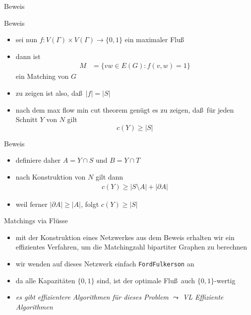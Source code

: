 \documentclass[aspectratio=1610, 11pt]{beamer}
\begin{document}
\begin{frame}
\begin{overprint}
\begin{exampleblock}{Beweis}
\begin{itemize}
			\end{itemize}
		\end{exampleblock}
		\begin{exampleblock}{Beweis}
			\begin{itemize}
				\item sei nun $f:V(\Gamma)\times V(\Gamma)\to\{0,1\}$ ein maximaler Flu\ss
				\item dann ist
					\begin{align*}
						M&=\{vw\in E(G):f(v,w)=1\}
					\end{align*}
					ein Matching von $G$
				\item zu zeigen ist also, da\ss\ $|f|=|S|$
				\item nach dem max flow min cut theorem gen\"ugt es zu zeigen, da\ss\ f\"ur jeden Schnitt $Y$ von $N$ gilt
					$$c(Y)\geq|S|$$
			\end{itemize}
		\end{exampleblock}
		\begin{exampleblock}{Beweis}
			\begin{itemize}
				\item definiere daher $A=Y\cap S$ und $B=Y\cap T$
				\item nach Konstruktion von $N$ gilt dann
					\begin{align*}
						c(Y)\geq|S\setminus A|+|\partial A|
					\end{align*}
				\item weil ferner $|\partial A|\geq|A|$, folgt $c(Y)\geq|S|$
			\end{itemize}
		\end{exampleblock}
		\begin{exampleblock}{Matchings via Fl\"usse}
			\begin{itemize}
				\item mit der Konstruktion eines Netzwerkes aus dem Beweis erhalten wir ein effizientes Verfahren, um die Matchingzahl bipartiter Graphen zu berechnen
				\item wir wenden auf dieses Netzwerk einfach {\tt FordFulkerson} an
				\item da alle Kapazit\"aten $\{0,1\}$ sind, ist der optimale Flu\ss\ auch $\{0,1\}$-wertig
				\item \itshape es gibt effizientere Algorithmen f\"ur dieses Problem $\leadsto$ VL Effiziente Algorithmen
			\end{itemize}
		\end{exampleblock}
	\end{overprint}
\end{frame}
\end{document}

